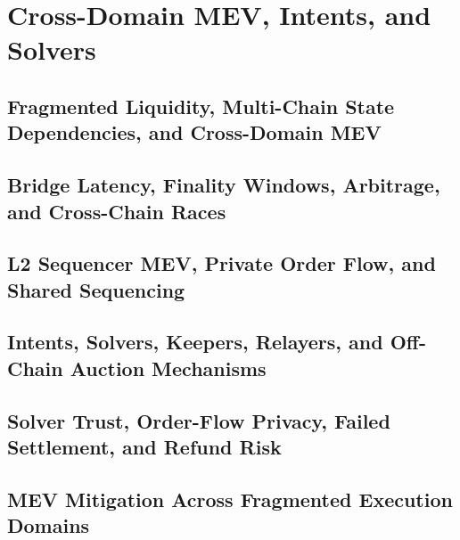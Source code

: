\chapter{Cross-Domain MEV, Intents, and Solvers}

\section{Fragmented Liquidity, Multi-Chain State Dependencies, and Cross-Domain MEV}

\section{Bridge Latency, Finality Windows, Arbitrage, and Cross-Chain Races}

\section{L2 Sequencer MEV, Private Order Flow, and Shared Sequencing}

\section{Intents, Solvers, Keepers, Relayers, and Off-Chain Auction Mechanisms}

\section{Solver Trust, Order-Flow Privacy, Failed Settlement, and Refund Risk}

\section{MEV Mitigation Across Fragmented Execution Domains}
